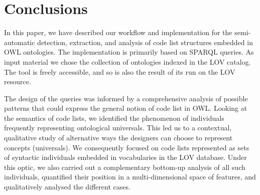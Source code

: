 \section{Conclusions}
\label{s:conclusion}
In this paper, we have described our workflow and implementation for the semi-automatic detection, extraction, and analysis of code list structures embedded in OWL ontologies. 
The implementation is primarily based on SPARQL queries.
As input material we chose the collection of ontologies indexed in the LOV catalog.
The tool is freely accessible, and so is also the result of its run on the LOV resource.

The design of the queries was informed by a comprehensive analysis of possible patterns that could express the general notion of code list in OWL.
Looking at the semantics of code lists, we identified the phenomenon of individuals frequently representing ontological universals. 
This led us to a contextual, qualitative study of alternative ways the designers can choose to represent concepts (universals).
We consequently focused on code lists represented as sets of syntactic individuals embedded in vocabularies in the LOV database.
Under this optic, we also carried out a complementary bottom-up analysis of all such individuals, quantified their position in a multi-dimensional space of features, and qualitatively analysed the different cases.



